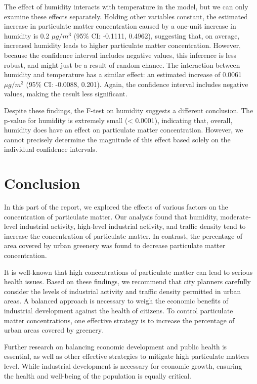 \documentclass[
]{article}
\begin{document}
The effect of humidity interacts with temperature in the model, but we
can only examine these effects separately. Holding other variables
constant, the estimated increase in particulate matter concentration
caused by a one-unit increase in humidity is 0.2 \(μg/m^3\) (95\% CI:
-0.1111, 0.4962), suggesting that, on average, increased humidity leads
to higher particulate matter concentration. However, because the
confidence interval includes negative values, this inference is less
robust, and might just be a result of random chance. The interaction
between humidity and temperature has a similar effect: an estimated
increase of 0.0061 \(μg/m^3\) (95\% CI: -0.0088, 0.201). Again, the
confidence interval includes negative values, making the result less
significant.

Despite these findings, the F-test on humidity suggests a different
conclusion. The p-value for humidity is extremely small (\textless{}
0.0001), indicating that, overall, humidity does have an effect on
particulate matter concentration. However, we cannot precisely determine
the magnitude of this effect based solely on the individual confidence
intervals.

\hypertarget{conclusion}{%
\section{Conclusion}\label{conclusion}}

In this part of the report, we explored the effects of various factors
on the concentration of particulate matter. Our analysis found that
humidity, moderate-level industrial activity, high-level industrial
activity, and traffic density tend to increase the concentration of
particulate matter. In contrast, the percentage of area covered by urban
greenery was found to decrease particulate matter concentration.

It is well-known that high concentrations of particulate matter can lead
to serious health issues. Based on these findings, we recommend that
city planners carefully consider the levels of industrial activity and
traffic density permitted in urban areas. A balanced approach is
necessary to weigh the economic benefits of industrial development
against the health of citizens. To control particulate matter
concentrations, one effective strategy is to increase the percentage of
urban areas covered by greenery.

Further research on balancing economic development and public health is
essential, as well as other effective strategies to mitigate high
particulate matters level. While industrial development is necessary for
economic growth, ensuring the health and well-being of the population is
equally critical.
\end{document}
